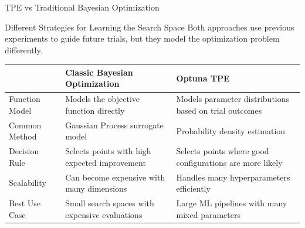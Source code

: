 \begin{frame}{TPE vs Traditional Bayesian Optimization}
\begin{block}{Different Strategies for Learning the Search Space}
Both approaches use previous experiments to guide future trials, but they model the optimization problem differently.
\end{block}

\begin{table}
\scriptsize
\centering
\begin{tabular}{p{}p{}p{}}
\toprule
& \textbf{Classic Bayesian Optimization} & \textbf{Optuna TPE} \\
\midrule

Function Model
& Models the objective function directly
& Models parameter distributions based on trial outcomes \\

Common Method
& Gaussian Process surrogate model
& Probability density estimation \\

Decision Rule
& Selects points with high expected improvement
& Selects points where good configurations are more likely \\

Scalability
& Can become expensive with many dimensions
& Handles many hyperparameters efficiently \\

Best Use Case
& Small search spaces with expensive evaluations
& Large ML pipelines with many mixed parameters \\

\bottomrule
\end{tabular}
\end{table}
\end{frame}


